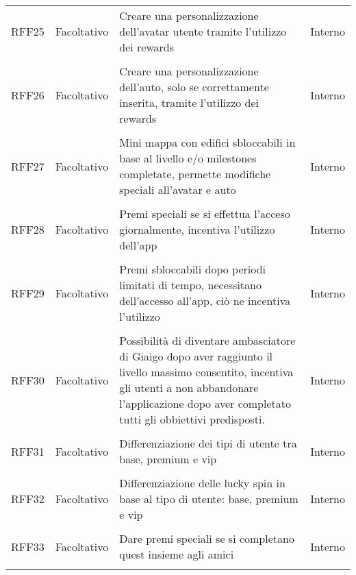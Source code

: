 \begin{longtable}{ >{\centering}p{} >{\centering}p{}
		>{\raggedright}p{} >{\centering}p{}}
	RFF25	&	Facoltativo	& Creare una personalizzazione dell'avatar utente tramite l'utilizzo dei rewards  &	Interno  \\ 	\tabularnewline
	RFF26	&	Facoltativo	& Creare una personalizzazione dell'auto, solo se correttamente inserita, tramite l'utilizzo dei rewards  &	Interno  \\ 	\tabularnewline
	RFF27	&	Facoltativo	& Mini mappa con edifici sbloccabili in base al livello e/o milestones completate, permette modifiche speciali all'avatar e auto  &	Interno  \\ 	\tabularnewline
	RFF28	&	Facoltativo	& Premi speciali se si effettua l'acceso giornalmente, incentiva l'utilizzo dell'app  &	Interno  \\ 	\tabularnewline
	RFF29	&	Facoltativo	& Premi sbloccabili dopo periodi limitati di tempo, necessitano dell'accesso all'app, ciò ne incentiva l'utilizzo  &	Interno  \\ 	\tabularnewline
	RFF30	&	Facoltativo	& Possibilità di diventare ambasciatore di Giaigo dopo aver raggiunto il livello massimo consentito, incentiva gli utenti a non abbandonare l'applicazione dopo aver completato tutti gli obbiettivi predisposti.  &	Interno  \\ 	\tabularnewline
	RFF31	&	Facoltativo	& Differenziazione dei tipi di utente tra base, premium e vip  &	Interno  \\ 	\tabularnewline
	RFF32	&	Facoltativo	& Differenziazione delle lucky spin in base al tipo di utente: base, premium e vip &	Interno  \\ 	\tabularnewline
	RFF33	&	Facoltativo	& Dare premi speciali se si completano quest insieme agli amici  &	Interno  \\ 	\tabularnewline
\end{longtable}

